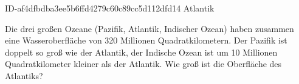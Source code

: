 \begin{exercise}
      {ID-af4dfbdba3ee5b6ffd4279c60c89cc5d112dfd14}
      {Atlantik}
  \ifproblem\problem\par
    Die drei großen Ozeane (Pazifik, Atlantik, Indischer Ozean) haben
    zusammen eine Wasseroberfläche von 320 Millionen Quadratkilometern.
    Der Pazifik ist doppelt so groß wie der Atlantik, der Indische Ozean
    ist um 10 Millionen Quadratkilometer kleiner als der Atlantik.
    Wie groß ist die Oberfläche des Atlantiks?
  \fi
\end{exercise}
